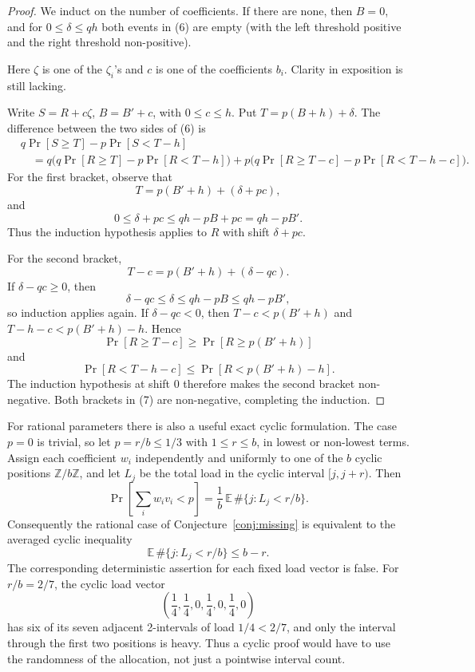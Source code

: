 \documentclass[12pt]{article}
\newcommand{\review}[1]{\begin{reviewbox}#1\end{reviewbox}}
\begin{document}
\begin{proof}
We induct on the number of coefficients.  If there are none, then
\(B=0\), and for \(0\le\delta\le qh\) both events in (6) are empty (with the
left threshold positive and the right threshold non-positive).

\review{Here $\zeta$ is one of the $\zeta_i$'s and $c$ is one of the coefficients $b_i$. Clarity in exposition is still lacking. }
Write \(S=R+c\zeta\), \(B=B'+c\), with \(0\le c\le h\).  Put
\(T=p(B+h)+\delta\).  The difference between the two sides of (6) is
\begin{equation}
\begin{aligned}
& q\Pr[S\ge T]-p\Pr[S<T-h]                                      \\
&\quad =
q\Big(q\Pr[R\ge T]-p\Pr[R<T-h]\Big)
+p\Big(q\Pr[R\ge T-c]-p\Pr[R<T-h-c]\Big).
\end{aligned}                                                   \tag{7}
\end{equation}
For the first bracket, observe that
\[
        T=p(B'+h)+(\delta+pc),
\]
and
\[
        0\le\delta+pc\le qh-pB+pc=qh-pB'.
\]
Thus the induction hypothesis applies to \(R\) with shift \(\delta+pc\).

For the second bracket,
\[
        T-c=p(B'+h)+(\delta-qc).
\]
If \(\delta-qc\ge0\), then
\[
        \delta-qc\le\delta\le qh-pB\le qh-pB',
\]
so induction applies again.  If \(\delta-qc<0\), then
\(T-c<p(B'+h)\) and \(T-h-c<p(B'+h)-h\).  Hence
\[
 \Pr[R\ge T-c]\ge \Pr[R\ge p(B'+h)]
\]
and
\[
 \Pr[R<T-h-c]\le \Pr[R<p(B'+h)-h].
\]
The induction hypothesis at shift \(0\) therefore makes the second bracket
non-negative.  Both brackets in (7) are non-negative, completing the induction.
\end{proof}

For rational parameters there is also a useful exact cyclic formulation.  The
case \(p=0\) is trivial, so let \(p=r/b\le1/3\) with \(1\le r\le b\), in
lowest or non-lowest terms.  Assign each coefficient \(w_i\)
independently and uniformly to one of the \(b\) cyclic positions
\(\mathbb Z/b\mathbb Z\), and let \(L_j\) be the total load in the cyclic
interval \([j,j+r)\).  Then
\[
        \Pr\!\left[\sum_i w_i v_i<p\right]
        =\frac1b\,\mathbb E\,\#\{j:L_j<r/b\}.              \tag{8}
\]
Consequently the rational case of Conjecture~\ref{conj:missing} is equivalent
to the averaged cyclic inequality
\[
        \mathbb E\,\#\{j:L_j<r/b\}\le b-r .                \tag{9}
\]
The corresponding deterministic assertion for each fixed load vector is false.
For \(r/b=2/7\), the cyclic load vector
\[
   \left(\frac14,\frac14,0,\frac14,0,\frac14,0\right)
\]
has six of its seven adjacent 2-intervals of load \(1/4<2/7\), and only the
interval through the first two positions is heavy.  Thus a cyclic proof would
have to use the randomness of the allocation, not just a pointwise interval
count.
\end{document}
